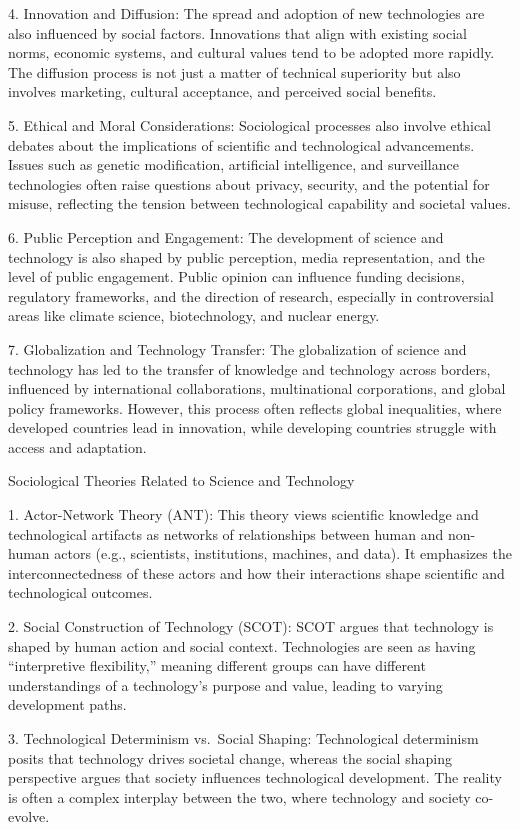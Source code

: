 4. Innovation and Diffusion: The spread and adoption of new technologies
are also influenced by social factors. Innovations that align with
existing social norms, economic systems, and cultural values tend to be
adopted more rapidly. The diffusion process is not just a matter of
technical superiority but also involves marketing, cultural acceptance,
and perceived social benefits.

5. Ethical and Moral Considerations: Sociological processes also involve
ethical debates about the implications of scientific and technological
advancements. Issues such as genetic modification, artificial
intelligence, and surveillance technologies often raise questions about
privacy, security, and the potential for misuse, reflecting the tension
between technological capability and societal values.

6. Public Perception and Engagement: The development of science and
technology is also shaped by public perception, media representation,
and the level of public engagement. Public opinion can influence funding
decisions, regulatory frameworks, and the direction of research,
especially in controversial areas like climate science, biotechnology,
and nuclear energy.

7. Globalization and Technology Transfer: The globalization of science
and technology has led to the transfer of knowledge and technology
across borders, influenced by international collaborations,
multinational corporations, and global policy frameworks. However, this
process often reflects global inequalities, where developed countries
lead in innovation, while developing countries struggle with access and
adaptation.

Sociological Theories Related to Science and Technology

1. Actor-Network Theory (ANT): This theory views scientific knowledge
and technological artifacts as networks of relationships between human
and non-human actors (e.g., scientists, institutions, machines, and
data). It emphasizes the interconnectedness of these actors and how
their interactions shape scientific and technological outcomes.

2. Social Construction of Technology (SCOT): SCOT argues that technology
is shaped by human action and social context. Technologies are seen as
having ``interpretive flexibility,'' meaning different groups can have
different understandings of a technology's purpose and value, leading to
varying development paths.

3. Technological Determinism vs.~Social Shaping: Technological
determinism posits that technology drives societal change, whereas the
social shaping perspective argues that society influences technological
development. The reality is often a complex interplay between the two,
where technology and society co-evolve.

